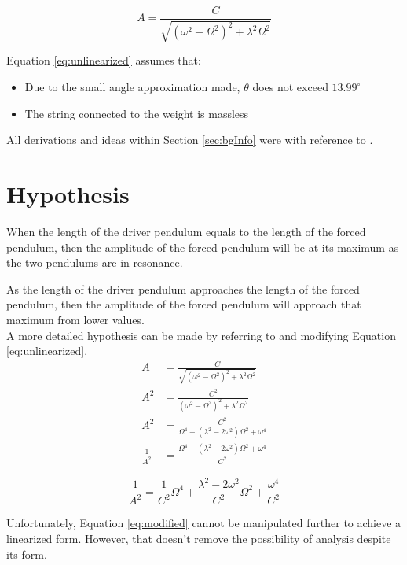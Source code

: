 \documentclass[letterpaper, 12pt]{article}
\begin{document}
\begin{equation} \label{eq:unlinearized}
    A = \frac{C}{\sqrt{(\omega^2 - \Omega^2)^2 + \lambda^2\Omega^2}}
\end{equation}

Equation \ref*{eq:unlinearized} assumes that:
\begin{itemize}
    \item Due to the small angle approximation made, \(\theta\) does not exceed \(13.99^{\circ}\) \cite{SmallangleApproximation2023}
    \item The string connected to the weight is massless
\end{itemize}

All derivations and ideas within Section \ref*{sec:bgInfo} were with reference to \cite{chasnov11DampedDriven2022}.

\section{Hypothesis}

When the length of the driver pendulum equals to the length of the forced pendulum,
then the amplitude of the forced pendulum will be at its maximum as the two pendulums
are in resonance.

As the length of the driver pendulum approaches the length of the forced pendulum,
then the amplitude of the forced pendulum will approach that maximum from lower values.
\\

A more detailed hypothesis can be made by referring to and modifying Equation \ref*{eq:unlinearized}.
\begin{align*}
    A             & = \frac{C}{\sqrt{(\omega^2 - \Omega^2)^2 + \lambda^2\Omega^2}}
    \\
    A^2           & = \frac{C^2}{(\omega^2 - \Omega^2)^2 + \lambda^2\Omega^2}
    \\
    A^2           & = \frac{C^2}{\Omega^4 + (\lambda^2 - 2\omega^2)\Omega^2 + \omega^4}
    \\
    \frac{1}{A^2} & = \frac{\Omega^4 + (\lambda^2 - 2\omega^2)\Omega^2 + \omega^4}{C^2}
\end{align*}

\begin{equation} \label{eq:modified}
    \frac{1}{A^2} = \frac{1}{C^2}\Omega^4 + \frac{\lambda^2 - 2\omega^2}{C^2}\Omega^2 + \frac{\omega^4}{C^2}
\end{equation}

Unfortunately, Equation \ref*{eq:modified} cannot be manipulated further
to achieve a linearized form. However, that doesn't remove
the possibility of analysis despite its form.
\end{document}
